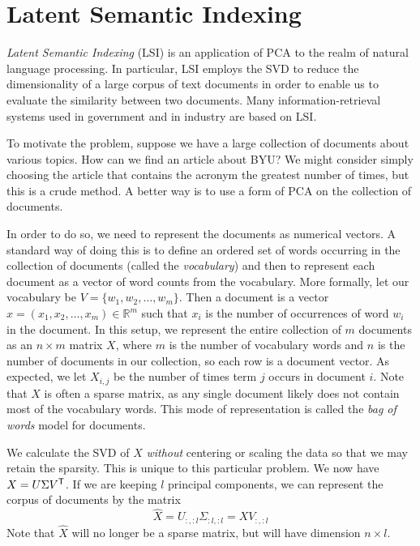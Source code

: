 \section*{Latent Semantic Indexing} %

\emph{Latent Semantic Indexing} (LSI) is an application of PCA to the realm of natural language processing.
In particular, LSI employs the SVD to reduce the dimensionality of a large corpus of text documents in order to enable us to evaluate the similarity between two documents.
Many information-retrieval systems used in government and in industry are based on LSI.

To motivate the problem, suppose we have a large collection of documents about various topics.
How can we find an article about BYU? %
We might consider simply choosing the article that contains the acronym the greatest number of times, but this is a crude method.
A better way is to use a form of PCA on the collection of documents.

In order to do so, we need to represent the documents as numerical vectors.
A standard way of doing this is to define an ordered set of words occurring in the collection of documents (called the \emph{vocabulary}) and then to represent each document as a vector of word counts from the vocabulary.
More formally, let our vocabulary be $V = \{w_1,w_2,\ldots,w_m\}$.
Then a document is a vector $x  = (x_1,x_2,\ldots,x_m) \in \mathbb{R}^m$ such that $x_i$ is the number of occurrences of word $w_i$ in the document.
In this setup, we represent the entire collection of $m$ documents as an $n \times m$ matrix $X$, where $m$ is the number of vocabulary words and $n$ is the number of documents in our collection, so each row is a document vector.
As expected, we let $X_{i,j}$ be the number of times term $j$ occurs in document $i$.
Note that $X$ is often a sparse matrix, as any single document likely does not contain most of the vocabulary words.
This mode of representation is called the \emph{bag of words} model for documents.

We calculate the SVD of $X$ \emph{without} centering or scaling the data so that we may retain the sparsity.
This is unique to this particular problem.
We now have $X = U\Sigma V^{\mathsf T} $.
If we are keeping $l$ principal components, we can represent the corpus of documents by the matrix
\[
\widehat{X} = U_{:,:l}\Sigma_{:l,:l} = XV_{:,:l}
\]
Note that $\widehat{X}$ will no longer be a sparse matrix, but will have dimension $n \times l$.

